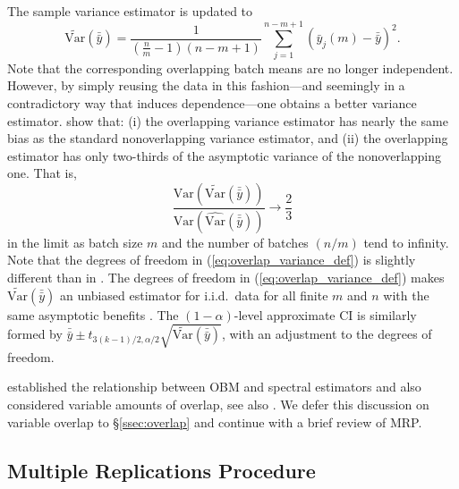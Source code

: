 \documentclass[12pt]{article}
\newcommand{\e}[1]{\mathbb{E} \left[ #1 \right]
}
\newcommand{\var}[1]{\mathrm{Var} \left( #1 \right)}
\newcommand{\vart}[1]{\widetilde{\mathrm{Var}} \left( #1 \right)}
\newcommand{\varhat}{\widehat{\mathrm{Var}}}
\newcommand{\X}{X}
\newcommand{\x}{\mathbf{x}}
\newcommand{\xh}{{\hat{\x}}}
\newcommand{\xit}{\boldsymbol{\xi}}
\newcommand{\zs}{z^*}
\newcommand{\yb}{\bar{y}}
\newcommand{\ybb}{\bar{\yb}}
\begin{document}
The sample variance estimator is updated to
\begin{equation} \label{eq:overlap_variance_def}
	\vart{\ybb} = \frac{1}{(\tfrac{n}{m}-1)(n - m + 1)}\sum_{j=1}^{n-m+1} (\yb_j(m) - \ybb)^2.
\end{equation}
Note that the corresponding overlapping batch means are no longer independent. 
However, by simply reusing the data in this fashion---and seemingly in a contradictory way that induces dependence---one obtains a better variance estimator. 
\citet{Meketon1984} show that: (i) the overlapping variance estimator has nearly the same bias as the standard nonoverlapping variance estimator, and (ii) the overlapping estimator has only two-thirds of the asymptotic variance of the nonoverlapping one.  
That is, 
\begin{equation} \label{eq:asym_var}
	\frac{ \var{\vart{\ybb}} }{ \var{\varhat(\ybb)} } \rightarrow \frac{2}{3}
\end{equation}
in the limit as batch size $m$ and the number of batches $(n/m)$ tend to infinity.  
Note that the degrees of freedom in (\ref{eq:overlap_variance_def}) is slightly different than in \citep{Meketon1984}.  
The degrees of freedom in (\ref{eq:overlap_variance_def}) makes $\vart{\ybb}$ an unbiased estimator for i.i.d.\ data for all finite $m$ and $n$ with the same asymptotic benefits \citep{Song1992}.  
The $(1-\alpha)$-level approximate CI is similarly formed by $\ybb \pm t_{3(k-1)/2,\alpha/2} \sqrt{\vart{\ybb}}$, with an adjustment to the degrees of freedom.

\citet{Welch1987} established the relationship between OBM and spectral estimators and also considered variable amounts of overlap, see also \citep{Song1992}.  
We defer this discussion on variable overlap to \S \ref{ssec:overlap} and continue with a brief review of MRP.

\subsection{Multiple Replications Procedure} 
\label{ssec:mrp}

\end{document}
